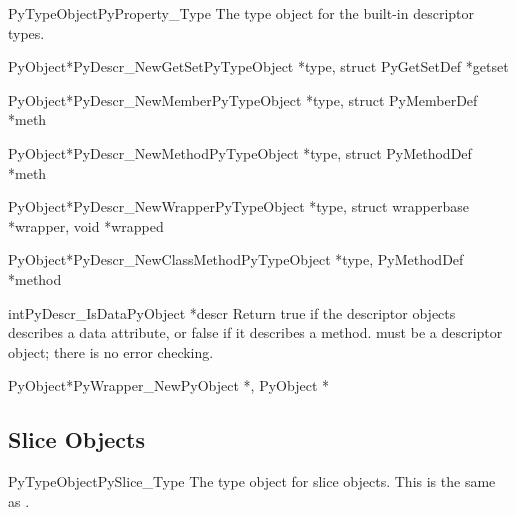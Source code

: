 \begin{cvardesc}{PyTypeObject}{PyProperty_Type}
  The type object for the built-in descriptor types.
\end{cvardesc}

\begin{cfuncdesc}{PyObject*}{PyDescr_NewGetSet}{PyTypeObject *type,
					        struct PyGetSetDef *getset}
\end{cfuncdesc}

\begin{cfuncdesc}{PyObject*}{PyDescr_NewMember}{PyTypeObject *type,
					        struct PyMemberDef *meth}
\end{cfuncdesc}

\begin{cfuncdesc}{PyObject*}{PyDescr_NewMethod}{PyTypeObject *type,
                                                struct PyMethodDef *meth}
\end{cfuncdesc}

\begin{cfuncdesc}{PyObject*}{PyDescr_NewWrapper}{PyTypeObject *type,
						 struct wrapperbase *wrapper,
                                                 void *wrapped}
\end{cfuncdesc}

\begin{cfuncdesc}{PyObject*}{PyDescr_NewClassMethod}{PyTypeObject *type,
						     PyMethodDef *method}
\end{cfuncdesc}

\begin{cfuncdesc}{int}{PyDescr_IsData}{PyObject *descr}
  Return true if the descriptor objects  describes a data
  attribute, or false if it describes a method.   must be a
  descriptor object; there is no error checking.
\end{cfuncdesc}

\begin{cfuncdesc}{PyObject*}{PyWrapper_New}{PyObject *, PyObject *}
\end{cfuncdesc}


\subsection{Slice Objects \label{slice-objects}}

\begin{cvardesc}{PyTypeObject}{PySlice_Type}
  The type object for slice objects.  This is the same as
  .
\end{cvardesc}

